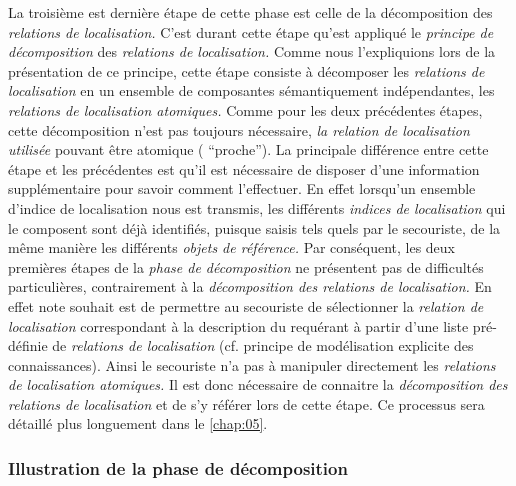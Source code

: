 La troisième est dernière étape de cette phase est celle de la
décomposition des \emph{relations de localisation.} C'est durant cette
étape qu'est appliqué le \emph{principe de décomposition} des
\emph{relations de localisation.} Comme nous l'expliquions lors de la
présentation de ce principe, cette étape consiste à décomposer les
\emph{relations de localisation} en un ensemble de composantes
sémantiquement indépendantes, les \emph{relations de localisation
  atomiques.} Comme pour les deux précédentes étapes, cette
décomposition n'est pas toujours nécessaire, \emph{la relation de
  localisation utilisée} pouvant être atomique (\eg
\enquote{proche}). La principale différence entre cette étape et les
précédentes est qu'il est nécessaire de disposer d'une information
supplémentaire pour savoir comment l'effectuer. En effet lorsqu'un
ensemble d'indice de localisation nous est transmis, les différents
\emph{indices de localisation} qui le composent sont déjà identifiés,
puisque saisis tels quels par le secouriste, de la même manière les
différents \emph{objets de référence.} Par conséquent, les deux
premières étapes de la \emph{phase de décomposition} ne présentent pas
de difficultés particulières, contrairement à la \emph{décomposition
  des relations de localisation.} En effet note souhait est de
permettre au secouriste de sélectionner la \emph{relation de
  localisation} correspondant à la description du requérant à partir
d'une liste pré-définie de \emph{relations de localisation}
(cf. principe de modélisation explicite des connaissances). Ainsi le
secouriste n'a pas à manipuler directement les \emph{relations de
  localisation atomiques.} Il est donc nécessaire de connaitre la
\emph{décomposition des relations de localisation} et de s'y référer
lors de cette étape. Ce processus sera détaillé plus longuement dans
le \autoref{chap:05}.

\subsubsection{Illustration de la phase de décomposition}

